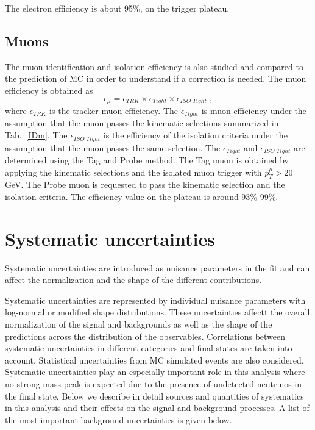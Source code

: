 The electron efficiency is about 95\%, on the trigger plateau. 


\subsection*{Muons} 
The muon identification and isolation efficiency is also studied and compared to the prediction of MC in order
to understand if a correction is needed. The muon efficiency is obtained as
\begin{equation}
\epsilon_{\mu} = \epsilon_{TRK} \times \epsilon_{Tight} \times \epsilon_{ISO \; Tight} \; ,
\end{equation}
\newline
where $ \epsilon_{TRK}$ is the tracker  muon efficiency.  
The $ \epsilon_{Tight} $ is muon efficiency
under the assumption that the muon passes the kinematic selections summarized in  Tab.~\ref{IDm}.
The $\epsilon_{ISO \; Tight}$ is the efficiency of the isolation criteria under the assumption that the muon passes the same selection.
The $\epsilon_{Tight}$ and $ \epsilon_{ISO \; Tight}$ are determined  using the Tag and Probe method. 
The Tag muon is obtained by applying  the kinematic selections  and   the isolated muon trigger  with $p_T^{\mu}>20$ GeV.
The Probe muon  is requested to pass the kinematic selection and the isolation criteria.
The efficiency value on the plateau is around 93\%-99\%.



\newpage

\section{Systematic uncertainties}\label{sec:systematics}
Systematic uncertainties are introduced as nuisance parameters in the fit and can affect the
normalization and the shape of the different contributions.

Systematic uncertainties are represented by individual nuisance parameters with log-normal or
modified shape distributions. These uncertainties affectt the overall normalization of the signal and
backgrounds as well as the shape of the predictions across the distribution of the observables.
Correlations between systematic uncertainties in different categories and final states are taken
into account. Statistical uncertainties from MC simulated events are also considered.
Systematic uncertainties play an especially important role in this analysis where
no strong mass peak is expected due to the presence of undetected neutrinos in the final state.
Below we describe in detail sources and quantities of systematics in this analysis and their
effects on the signal and background processes.
A list of the most important background uncertainties is given below.


